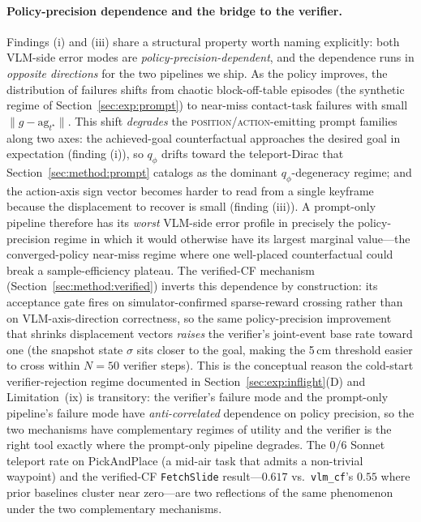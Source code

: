 \documentclass{article}
\begin{document}
\paragraph{Policy-precision dependence and the bridge to the verifier.}
Findings (i) and (iii) share a structural property worth naming
explicitly: both VLM-side error modes are
\emph{policy-precision-dependent}, and the dependence runs in
\emph{opposite directions} for the two pipelines we ship. As the policy
improves, the distribution of failures shifts from chaotic
block-off-table episodes (the synthetic regime of
Section~\ref{sec:exp:prompt}) to near-miss contact-task failures with
small $\lVert g-\mathrm{ag}_{t^\star}\rVert$. This shift
\emph{degrades} the \textsc{position}/\textsc{action}-emitting prompt
families along two axes: the achieved-goal counterfactual approaches
the desired goal in expectation (finding (i)), so $q_\phi$ drifts
toward the teleport-Dirac that
Section~\ref{sec:method:prompt} catalogs as the dominant
$q_\phi$-degeneracy regime; and the
action-axis sign vector becomes harder to read from a single keyframe
because the displacement to recover is small (finding (iii)). A
prompt-only pipeline therefore has its \emph{worst} VLM-side error
profile in precisely the policy-precision regime in which it would
otherwise have its largest marginal value---the converged-policy
near-miss regime where one well-placed counterfactual could break a
sample-efficiency plateau. The verified-CF mechanism
(Section~\ref{sec:method:verified}) inverts this dependence by
construction: its acceptance gate fires on simulator-confirmed
sparse-reward crossing rather than on VLM-axis-direction correctness,
so the same policy-precision improvement that shrinks displacement
vectors \emph{raises} the verifier's joint-event base rate toward one
(the snapshot state $\sigma$ sits closer to the goal, making the
5\,cm threshold easier to cross within $N\!=\!50$ verifier steps).
This is the conceptual reason the cold-start verifier-rejection regime
documented in
Section~\ref{sec:exp:inflight}(D) and Limitation~(ix) is transitory:
the verifier's failure mode and the prompt-only pipeline's failure
mode have \emph{anti-correlated} dependence on policy precision, so
the two mechanisms have complementary regimes of utility and the
verifier is the right tool exactly where the prompt-only pipeline
degrades. The 0/6 Sonnet teleport rate on PickAndPlace (a
mid-air task that admits a non-trivial waypoint) and the verified-CF
\texttt{FetchSlide} result---$0.617$ vs.\ \texttt{vlm\_cf}'s $0.55$
where prior baselines cluster near zero---are two reflections of the
same phenomenon under the two complementary mechanisms.
\end{document}
